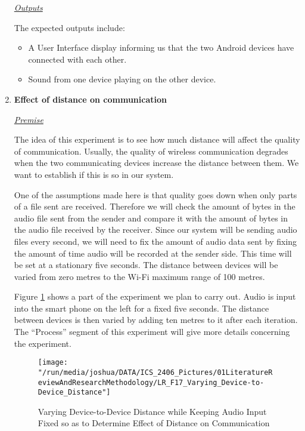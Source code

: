 \documentclass[12pt,svgnames,smaller]{article} %
\begin{document}
\begin{enumerate}
			\emph{\underline{\textsf{Outputs}}}
			
			The expected outputs include:
			
			\begin{itemize}
				\item A User Interface display informing us that the two Android devices have connected with each other.
				\item Sound from one device playing on the other device.
			\end{itemize}
			
			
			\item \textbf{Effect of distance on communication}
			
			\emph{\underline{\textsf{Premise}}}
			
			The idea of this experiment is to see how much distance will affect the quality of communication. Usually, the quality of wireless communication degrades when the two communicating devices increase the distance between them. We want to establish if this is so in our system. 
			
			One of the assumptions made here is that quality goes down when only parts of a file sent are received. Therefore we will check the amount of bytes in the audio file sent from the sender and compare it with the amount of bytes in the audio file received by the receiver. Since our system will be sending audio files every second, we will need to fix the amount of audio data sent by fixing the amount of time audio will be recorded at the sender side. This time will be set at a stationary five seconds. The distance between devices will be varied from zero metres to the Wi-Fi maximum range of 100 metres.
			
			Figure \ref{fig:LiteratureReview-Figure17} shows a part of the experiment we plan to carry out. Audio is input into the smart phone on the left for a fixed five seconds. The distance between devices is then varied by adding ten metres to it after each iteration. The “Process” segment of this experiment will give more details concerning the experiment.
			
			\begin{figure}
				\centering
				\texttt{[image: "/run/media/joshua/DATA/ICS\_2406\_Pictures/01LiteratureReviewAndResearchMethodology/LR\_F17\_Varying\_Device-to-Device\_Distance"]}
				\caption{Varying Device-to-Device Distance while Keeping Audio Input Fixed so as to Determine Effect of Distance on Communication }
				\label{fig:LiteratureReview-Figure17}
			\end{figure}
			

\end{enumerate}
\end{document}
